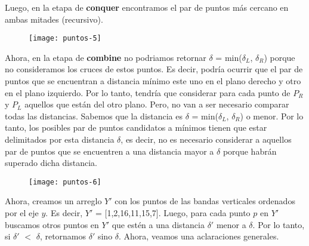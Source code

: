 \documentclass[10pt,a4paper]{article}
\begin{document}
\newline
\newline
Luego, en la etapa de \textbf{conquer} encontramos el par de puntos más cercano en ambas mitades (recursivo).
\newline
\newline
\begin{figure}[h]
	\centering
\texttt{[image: puntos-5]}
	\label{drivers1}
\end{figure}
\newpage
Ahora, en la etapa de \textbf{combine} no podriamos retornar $\delta$ = min($\delta_{L}$, $\delta_{R}$) porque no consideramos los cruces de estos puntos. Es decir, podría ocurrir que el par de puntos que se encuentran a distancia mínimo este uno en el plano derecho y otro en el plano izquierdo. 
\newline
\newline
Por lo tanto, tendría que considerar para cada punto de $P_{R}$ y $P_{L}$ aquellos que están del otro plano. Pero, no van a ser necesario comparar todas las distancias.
\newline
\newline
Sabemos que la distancia es $\delta$ = min($\delta_{L}$, $\delta_{R}$) o menor. Por lo tanto, los posibles par de puntos candidatos a mínimos tienen que estar delimitados por esta distancia $\delta$, es decir, no es necesario considerar a aquellos par de puntos que se encuentren a una distancia mayor a $\delta$ porque habrán superado dicha distancia.   
\newline
\newline
\begin{figure}[h]
	\centering
\texttt{[image: puntos-6]}
	\label{drivers1}
\end{figure}
\newline
\newline
Ahora, creamos un arreglo $Y'$ con los puntos de las bandas verticales ordenados por el eje $y$. Es decir, $Y'$ = [1,2,16,11,15,7].
\newline
\newline
Luego, para cada punto $p$ en $Y'$ buscamos otros puntos en $Y'$ que estén a una distancia $\delta'$ menor a $\delta$. 
\newline
\newline
Por lo tanto, si $\delta'$ $<$ $\delta$, retornamos $\delta'$ sino $\delta$. 
\newline
\newline
Ahora, veamos una aclaraciones generales.
\newline
\end{document}
